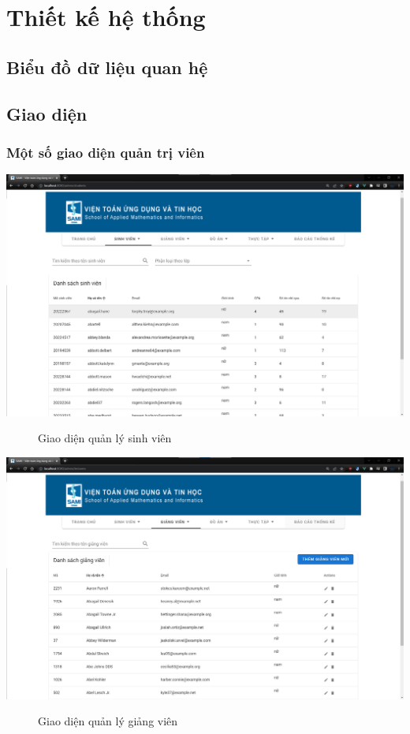 \chapter{Thiết kế hệ thống}
  \section{Biểu đồ dữ liệu quan hệ}
  

  \section{Giao diện}
    \subsection*{Một số giao diện quản trị viên}
    \begin{center}
      \includegraphics[width=.95\textwidth]{./image/design/admin/sv.png}
      \begin{figure}[h]
        \centering
        \caption{Giao diện quản lý sinh viên}
      \end{figure}
    \end{center}
    \begin{center}
      \includegraphics[width=.95\textwidth]{./image/design/admin/gv.png}
      \begin{figure}[h]
        \centering
        \caption{Giao diện quản lý giảng viên}
      \end{figure}
    \end{center}
